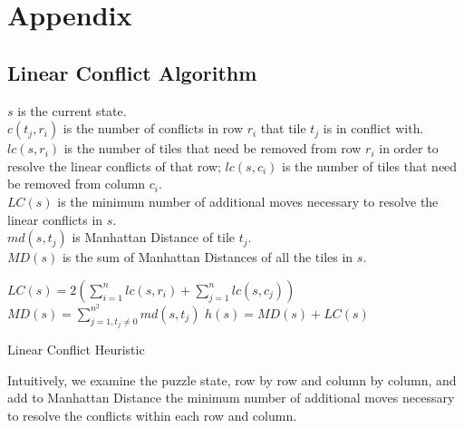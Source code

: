 \documentclass{llncs}
\begin{document}
\newpage




\newpage
\section{Appendix}

\subsection{Linear Conflict Algorithm}
\begin{definition}$ $\\
	$s$ is the current state.\\
	$c(t_j,r_i)$ is the number of conflicts in row $r_i$ that tile $t_j$ is in conflict with.\\
	$lc(s, r_i)$ is the number of tiles that need be removed from row $r_i$ in order to resolve the linear conflicts of that row; $lc(s, c_i)$ is the number of tiles that need be removed from column $c_i$.\\
	$LC(s)$ is the minimum number of additional moves necessary to resolve the linear conflicts in $s$.\\
	$md(s, t_j)$ is Manhattan Distance of tile $t_j$.\\
	$MD(s)$ is the sum of Manhattan Distances of all the tiles in $s$.
\end{definition}

\begin{algorithm}[H]


	$LC(s) = 2(\sum^n_{i=1} lc(s,r_i) + \sum^n_{j=1} lc(s,c_j))$\;
	$MD(s) = \sum^{n^2}_{j=1, t_j \neq 0}md(s,t_j)$\;
	$h(s) = MD(s) + LC(s)$\;
	\caption{Linear Conflict Heuristic}
\end{algorithm}

Intuitively, we examine the puzzle state, row by row and column by column, and add to Manhattan Distance the minimum number of additional moves necessary to resolve the conflicts within each row and column.
\end{document}
